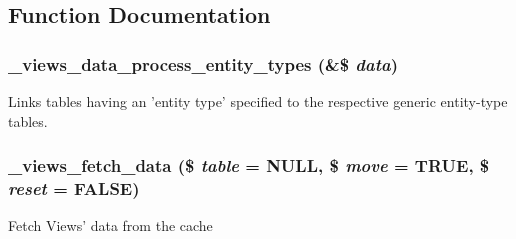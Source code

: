 \subsection{Function Documentation}
\hypertarget{views_2includes_2cache_8inc_ab785ab7dc065d39a7789b7f98a701153}{
\subsubsection[{\_\-views\_\-data\_\-process\_\-entity\_\-types}]{\setlength{\rightskip}{0pt plus 5cm}\_\-views\_\-data\_\-process\_\-entity\_\-types (\&\$ {\em data})}}
\label{views_2includes_2cache_8inc_ab785ab7dc065d39a7789b7f98a701153}
Links tables having an 'entity type' specified to the respective generic entity-\/type tables. \hypertarget{views_2includes_2cache_8inc_a367769ad7eed921c7796b27dffb5e60a}{
\subsubsection[{\_\-views\_\-fetch\_\-data}]{\setlength{\rightskip}{0pt plus 5cm}\_\-views\_\-fetch\_\-data (\$ {\em table} = {\ttfamily NULL}, \/  \$ {\em move} = {\ttfamily TRUE}, \/  \$ {\em reset} = {\ttfamily FALSE})}}
\label{views_2includes_2cache_8inc_a367769ad7eed921c7796b27dffb5e60a}
Fetch Views' data from the cache


